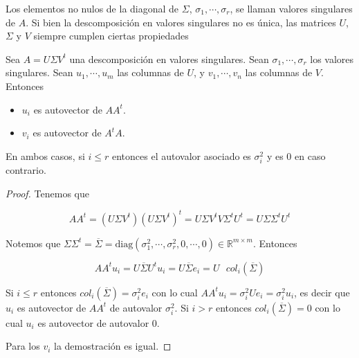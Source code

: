 Los elementos no nulos de la diagonal de $\Sigma$, $\sigma_1, \cdots, \sigma_r$, se llaman valores singulares de $A$. Si bien la descomposición en valores singulares no es única, las matrices $U$, $\Sigma$ y $V$ siempre cumplen ciertas propiedades

\begin{propo}
Sea $A = U \Sigma V^t$ una descomposición en valores singulares. Sean $\sigma_1, \cdots, \sigma_r$ los valores singulares. Sean $u_1, \cdots, u_m$ las columnas de $U$, y $v_1, \cdots, v_n$ las columnas de $V$. Entonces
\begin{itemize}
\item $u_i$ es autovector de $AA^t$.
\item $v_i$ es autovector de $A^tA$.
\end{itemize}
En ambos casos, si $i \leq r$ entonces el autovalor asociado es $\sigma_i^2$ y es 0 en caso contrario.

\begin{proof}
Tenemos que

\[AA^t = (U \Sigma V^t)(U \Sigma V^t)^t = U \Sigma V^t V \Sigma^t U^t = U \Sigma \Sigma^t U^t\]

Notemos que $\Sigma \Sigma^t = \overline{\Sigma} = \text{diag}(\sigma_1^2, \cdots, \sigma_r^2, 0, \cdots, 0) \in \mathbb{R}^{m \times m}$. Entonces

\[AA^tu_i = U \overline{\Sigma} U^t u_i = U \overline{\Sigma} e_i = U \text{ } col_i(\overline{\Sigma})\]

Si $i \leq r$ entonces $col_i(\overline{\Sigma}) = \sigma_i^2 e_i$ con lo cual $AA^t u_i = \sigma_i^2 U e_i = \sigma_i^2 u_i$, es decir que $u_i$ es autovector de $AA^t$ de autovalor $\sigma_i^2$. Si $i > r$ entonces $col_i(\overline{\Sigma}) = 0$ con lo cual $u_i$ es autovector de autovalor 0.

Para los $v_i$ la demostración es igual.
\end{proof}
\end{propo}